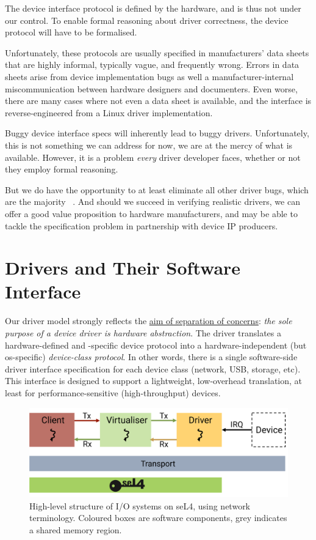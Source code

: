 \documentclass[a4paper,12pt]{report}
\newcommand{\figscale}{0.2}
\begin{document}
The device interface protocol is defined by the hardware, and is thus not
under our control. To enable formal reasoning about driver
correctness, the device protocol will have to be formalised.

Unfortunately, these protocols are usually specified in manufacturers'
data sheets that are highly informal, typically vague, and frequently
wrong. Errors in data sheets arise from device implementation bugs as
well a manufacturer-internal miscommunication between hardware
designers and documenters. Even worse, there are many cases where not
even a data sheet is available, and the interface is
reverse-engineered from a Linux driver implementation.

Buggy device interface specs will inherently lead to buggy
drivers. Unfortunately, this is not something we can address for now,
we are at the mercy of what is available. However, it is a problem \emph{every}
driver developer faces, whether or not they employ formal reasoning.

But we do have the opportunity to at least eliminate all other driver
bugs, which are the majority ~\citep{Ryzhyk_CKH_09}. And should we
succeed in verifying realistic drivers, we can offer a good value
proposition to hardware manufacturers, and may be able to tackle the
specification problem in partnership with device IP producers.

\chapter{Drivers and Their Software Interface}\label{s:driver}

Our driver model strongly reflects the \hyperref[s:aims]{aim of separation of
  concerns}: \emph{the sole purpose of a device driver is hardware
abstraction}. The driver translates a hardware-defined and -specific
device protocol into a hardware-independent (but \gls{os}-specific)
\emph{device-class protocol}. In other words, there is a single
software-side driver interface specification for each device class (network,
USB, storage, etc). This interface is designed to support a
lightweight, low-overhead translation, at least for
performance-sensitive (high-throughput) devices.

\begin{figure}[th]
  \centering
  \includegraphics[scale=\figscale]{structure}
  \caption[High-level structure of I/O systems on seL4, using network
    terminology.]{High-level structure of I/O systems on seL4, using network
    terminology. Coloured boxes are software components, grey
    indicates a shared memory region.}
  \label{f:structure}
\end{figure}
\end{document}
